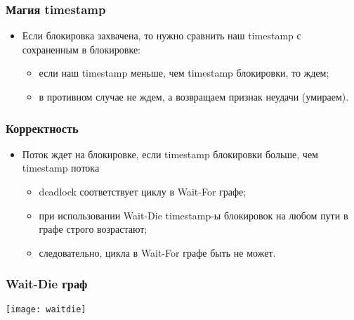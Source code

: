 \begin{frame}
\frametitle{Магия timestamp}
\begin{itemize}
    \item<1->Если блокировка захвачена, то нужно сравнить наш timestamp с
         сохраненным в блокировке:
    \begin{itemize}
        \item<2->если наш timestamp меньше, чем timestamp блокировки, то ждем;
        \item<3->в противном случае не ждем, а возвращаем признак неудачи
             (умираем).
    \end{itemize}
\end{itemize}
\end{frame}

\begin{frame}
\frametitle{Корректность}
\begin{itemize}
    \item<1->Поток ждет на блокировке, если timestamp блокировки больше,
         чем timestamp потока
    \begin{itemize}
        \item<2->deadlock соответствует циклу в Wait-For графе;
        \item<3->при использовании Wait-Die timestamp-ы блокировок на любом
             пути в графе строго возрастают;
        \item<4->следовательно, цикла в Wait-For графе быть не может.
    \end{itemize}
\end{itemize}
\end{frame}

\begin{frame}
\frametitle{Wait-Die граф}
\texttt{[image: waitdie]}
\end{frame}

